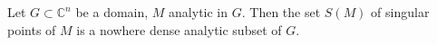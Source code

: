 Let $G \subset \mathbb{C}^n$ be a domain, $M$ analytic in $G$. Then the set $S(M)$ of singular points of $M$ is a nowhere dense analytic subset of $G$.
